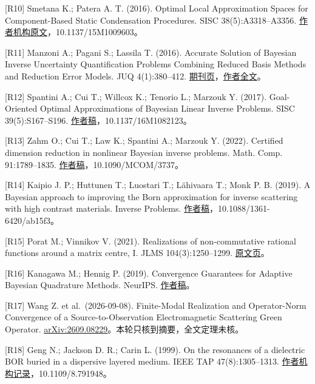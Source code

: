 \documentclass[
  10pt,
  a4paper,
]{article}
\begin{document}
{[}R10{]} Smetana K.; Patera A. T. (2016). Optimal Local Approximation
Spaces for Component-Based Static Condensation Procedures. SISC
38(5):A3318--A3356.
\href{https://dspace.mit.edu/entities/publication/98c5582d-4c97-4e6e-9f02-2bea41a29a29}{作者机构原文}，10.1137/15M1009603。

{[}R11{]} Manzoni A.; Pagani S.; Lassila T. (2016). Accurate Solution of
Bayesian Inverse Uncertainty Quantification Problems Combining Reduced
Basis Methods and Reduction Error Models. JUQ 4(1):380--412.
\href{https://epubs.siam.org/doi/10.1137/140995817}{期刊页}，\href{https://eprints.whiterose.ac.uk/id/eprint/95248/11/WRRO_95248.pdf}{作者全文}。

{[}R12{]} Spantini A.; Cui T.; Willcox K.; Tenorio L.; Marzouk Y.
(2017). Goal-Oriented Optimal Approximations of Bayesian Linear Inverse
Problems. SISC 39(5):S167--S196.
\href{https://arxiv.org/abs/1607.01881}{作者稿}，10.1137/16M1082123。

{[}R13{]} Zahm O.; Cui T.; Law K.; Spantini A.; Marzouk Y. (2022).
Certified dimension reduction in nonlinear Bayesian inverse problems.
Math. Comp. 91:1789--1835.
\href{https://arxiv.org/abs/1807.03712}{作者稿}，10.1090/MCOM/3737。

{[}R14{]} Kaipio J. P.; Huttunen T.; Luostari T.; Lähivaara T.; Monk P.
B. (2019). A Bayesian approach to improving the Born approximation for
inverse scattering with high contrast materials. Inverse Problems.
\href{https://arxiv.org/abs/1901.00909}{作者稿}，10.1088/1361-6420/ab15f3。

{[}R15{]} Porat M.; Vinnikov V. (2021). Realizations of non-commutative
rational functions around a matrix centre, I. JLMS 104(3):1250--1299.
\href{https://londmathsoc.onlinelibrary.wiley.com/doi/10.1112/jlms.12459}{原文页}。

{[}R16{]} Kanagawa M.; Hennig P. (2019). Convergence Guarantees for
Adaptive Bayesian Quadrature Methods. NeurIPS.
\href{https://arxiv.org/abs/1905.10271}{作者稿}。

{[}R17{]} Wang Z. et al.~(2026-09-08). Finite-Modal Realization and
Operator-Norm Convergence of a Source-to-Observation Electromagnetic
Scattering Green Operator.
\href{https://arxiv.org/abs/2609.08229}{arXiv:2609.08229}。本轮只核到摘要，全文定理未核。

{[}R18{]} Geng N.; Jackson D. R.; Carin L. (1999). On the resonances of
a dielectric BOR buried in a dispersive layered medium. IEEE TAP
47(8):1305--1313.
\href{https://scholars.duke.edu/publication/749511}{作者机构记录}，10.1109/8.791948。
\end{document}
